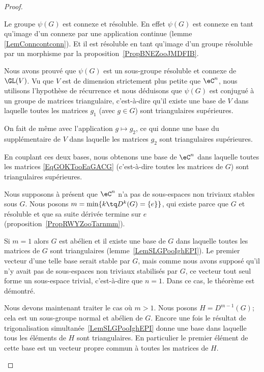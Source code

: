 \begin{proof}
\begin{subproof}
		Le groupe \( \psi(G)\) est connexe et résoluble. En effet \( \psi(G)\) est connexe en tant qu'image d'un connexe par une application continue (lemme \ref{LemConncontconn}). Et il est résoluble en tant qu'image d'un groupe résoluble par un morphisme par la proposition~\ref{PropBNEZooJMDFIB}.

		Nous avons prouvé que \( \psi(G)\) est un sous-groupe résoluble et connexe de \( \GL(V)\). Vu que \( V\) est de dimension strictement plus petite que \( \eC^n\), nous utilisons l'hypothèse de récurrence et nous déduisons que \( \psi(G)\) est conjugué à un groupe de matrices triangulaire, c'est-à-dire qu'il existe une base de \( V\) dans laquelle toutes les matrices \( g_1\) (avec \( g\in G\)) sont triangulaires supérieures.

		On fait de même avec l'application \( g\mapsto g_2\), ce qui donne une base du supplémentaire de \( V\) dans laquelle les matrices \( g_2\) sont triangulaires supérieures.

		En couplant ces deux bases, nous obtenons une base de \( \eC^n\) dans laquelle toutes les matrices \eqref{EqGOKTooEaGACG} (c'est-à-dire toutes les matrices de \( G\)) sont triangulaires supérieures.

		\spitem[Sinon]
		Nous supposons à présent que \( \eC^n\) n'a pas de sous-espaces non triviaux stables sous \( G\). Nous posons \( m=\min\{ k\tq D^k(G)=\{ e \} \}\), qui existe parce que \( G\) et résoluble et que sa suite dérivée termine sur \( {e}\) (proposition~\ref{PropRWYZooTarnmm}).

		\spitem[Si \( m=1\)]
		Si \( m=1\) alors \( G\) est abélien et il existe une base de \( G\) dans laquelle toutes les matrices de \( G\) sont triangulaires (lemme~\ref{LemSLGPooIghEPI}). Le premier vecteur d'une telle base serait stable par \( G\), mais comme nous avons supposé qu'il n'y avait pas de sous-espaces non triviaux stabilisés par \( G\), ce vecteur tout seul forme un sous-espace trivial, c'est-à-dire que \( n=1\). Dans ce cas, le théorème est démontré.

		\spitem[Si \( m>1\)]
		Nous devons maintenant traiter le cas où \( m>1\). Nous posons \( H=D^{m-1}(G)\); cela est un sous-groupe normal et abélien de \( G\). Encore une fois le résultat de trigonalisation simultanée~\ref{LemSLGPooIghEPI} donne une base dans laquelle tous les éléments de \( H\) sont triangulaires. En particulier le premier élément de cette base est un vecteur propre commun à toutes les matrices de \( H\).


\end{subproof}
\end{proof}
